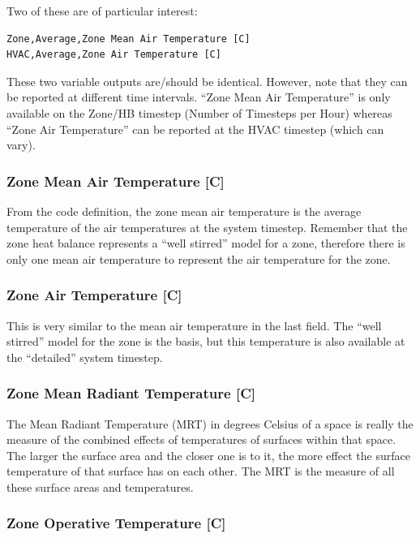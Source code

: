 Two of these are of particular interest:

\begin{lstlisting}
Zone,Average,Zone Mean Air Temperature [C]
HVAC,Average,Zone Air Temperature [C]
\end{lstlisting}

These two variable outputs are/should be identical. However, note that they can be reported at different time intervals. ``Zone Mean Air Temperature'' is only available on the Zone/HB timestep (Number of Timesteps per Hour) whereas ``Zone Air Temperature'' can be reported at the HVAC timestep (which can vary).

\subsubsection{Zone Mean Air Temperature {[}C{]}}\label{zone-mean-air-temperature-c-1}

From the code definition, the zone mean air temperature is the average temperature of the air temperatures at the system timestep. Remember that the zone heat balance represents a ``well stirred'' model for a zone, therefore there is only one mean air temperature to represent the air temperature for the zone.

\subsubsection{Zone Air Temperature {[}C{]}}\label{zone-air-temperature-c-1}

This is very similar to the mean air temperature in the last field. The ``well stirred'' model for the zone is the basis, but this temperature is also available at the ``detailed'' system timestep.

\subsubsection{Zone Mean Radiant Temperature {[}C{]}}\label{zone-mean-radiant-temperature-c-1}

The Mean Radiant Temperature (MRT) in degrees Celsius of a space is really the measure of the combined effects of temperatures of surfaces within that space. The larger the surface area and the closer one is to it, the more effect the surface temperature of that surface has on each other. The MRT is the measure of all these surface areas and temperatures.

\subsubsection{Zone Operative Temperature {[}C{]}}\label{zone-operative-temperature-c-1}

